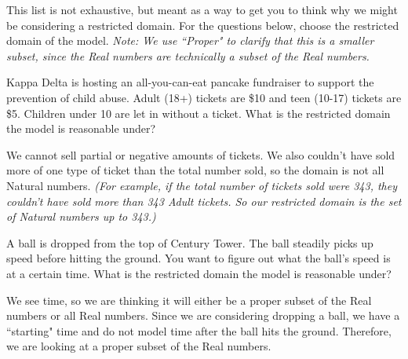\documentclass{ximera}
\begin{document}
This list is not exhaustive, but meant as a way to get you to think why we might be considering a restricted domain. For the questions below, choose the restricted domain of the model. \textit{Note: We use ``Proper" to clarify that this is a smaller subset, since the Real numbers are technically a subset of the Real numbers.} 

\begin{question}
Kappa Delta is hosting an all-you-can-eat pancake fundraiser to support the prevention of child abuse. Adult (18+) tickets are \$10 and teen (10-17) tickets are \$5. Children under 10 are let in without a ticket. What is the restricted domain the model is reasonable under?

\begin{multipleChoice}
\end{multipleChoice}

\begin{feedback}[correct]
We cannot sell partial or negative amounts of tickets. We also couldn't have sold more of one type of ticket than the total number sold, so the domain is not all Natural numbers. \textit{(For example, if the total number of tickets sold were 343, they couldn't have sold more than 343 Adult tickets. So our restricted domain is the set of Natural numbers up to 343.)}
\end{feedback}
\end{question}

\begin{question}
A ball is dropped from the top of Century Tower. The ball steadily picks up speed before hitting the ground. You want to figure out what the ball's speed is at a certain time. What is the restricted domain the model is reasonable under?

\begin{multipleChoice}
\end{multipleChoice}

\begin{feedback}[correct]
We see time, so we are thinking it will either be a proper subset of the Real numbers or all Real numbers. Since we are considering dropping a ball, we have a ``starting" time and do not model time after the ball hits the ground. Therefore, we are looking at a proper subset of the Real numbers. 
\end{feedback}

\end{question}
\end{document}
